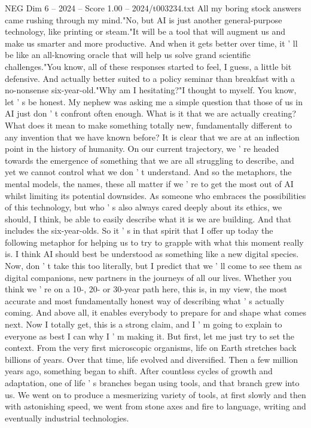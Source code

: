 \begin{textsample}{NEG Dim 6 – 2024 – Score 1.00 – 2024/t003234.txt}
All my boring stock answers came rushing through my mind."No, but AI is just another general-purpose technology, like printing or steam."It will be a tool that will augment us and make us smarter and more productive.
And when it gets better over time, it ' ll be like an all-knowing oracle that will help us solve grand scientific challenges."You know, all of these responses started to feel, I guess, a little bit defensive.
And actually better suited to a policy seminar than breakfast with a no-nonsense six-year-old."Why am I hesitating?"I thought to myself.
You know, let ' s be honest.
My nephew was asking me a simple question that those of us in AI just don ' t confront often enough.
What is it that we are actually creating?
What does it mean to make something totally new, fundamentally different to any invention that we have known before?
It is clear that we are at an inflection point in the history of humanity.
On our current trajectory, we ' re headed towards the emergence of something that we are all struggling to describe, and yet we cannot control what we don ' t understand.
And so the metaphors, the mental models, the names, these all matter if we ' re to get the most out of AI whilst limiting its potential downsides.
As someone who embraces the possibilities of this technology, but who ' s also always cared deeply about its ethics, we should, I think, be able to easily describe what it is we are building.
And that includes the six-year-olds.
So it ' s in that spirit that I offer up today the following metaphor for helping us to try to grapple with what this moment really is.
I think AI should best be understood as something like a new digital species.
Now, don ' t take this too literally, but I predict that we ' ll come to see them as digital companions, new partners in the journeys of all our lives.
Whether you think we ' re on a 10-, 20- or 30-year path here, this is, in my view, the most accurate and most fundamentally honest way of describing what ' s actually coming.
And above all, it enables everybody to prepare for and shape what comes next.
Now I totally get, this is a strong claim, and I ' m going to explain to everyone as best I can why I ' m making it.
But first, let me just try to set the context.
From the very first microscopic organisms, life on Earth stretches back billions of years.
Over that time, life evolved and diversified.
Then a few million years ago, something began to shift.
After countless cycles of growth and adaptation, one of life ' s branches began using tools, and that branch grew into us.
We went on to produce a mesmerizing variety of tools, at first slowly and then with astonishing speed, we went from stone axes and fire to language, writing and eventually industrial technologies.

\end{textsample}
